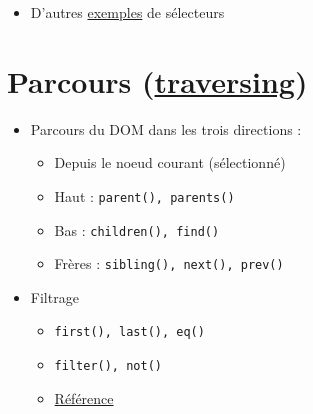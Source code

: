 \begin{english}

\begin{Shaded}
\begin{Highlighting}[]
\FunctionTok{$}\NormalTok{(}\NormalTok{)}\OperatorTok{;}
\end{Highlighting}
\end{Shaded}

\end{english}

\begin{itemize}
\tightlist
\item
  D'autres
  \href{https://www.w3schools.com/jquery/jquery_selectors.asp}{exemples}
  de sélecteurs
\end{itemize}

\hypertarget{parcours-traversing3}{%
\section{\texorpdfstring{Parcours
(\href{https://www.w3schools.com/jquery/jquery_traversing.asp}{traversing})}{Parcours (traversing)}}\label{parcours-traversing3}}

\begin{itemize}
\tightlist
\item
  Parcours du DOM dans les trois directions :

  \begin{itemize}
  \tightlist
  \item
    Depuis le noeud courant (sélectionné)
  \item
    Haut : \textenglish{\texttt{parent(),\ parents()}}
  \item
    Bas : \textenglish{\texttt{children(),\ find()}}
  \item
    Frères : \textenglish{\texttt{sibling(),\ next(),\ prev()}}
  \end{itemize}
\item
  Filtrage

  \begin{itemize}
  \tightlist
  \item
    \textenglish{\texttt{first(),\ last(),\ eq()}}
  \item
    \textenglish{\texttt{filter(),\ not()}}
  \item
    \href{https://www.w3schools.com/jquery/jquery_ref_traversing.asp}{Référence}
  \end{itemize}
\end{itemize}

